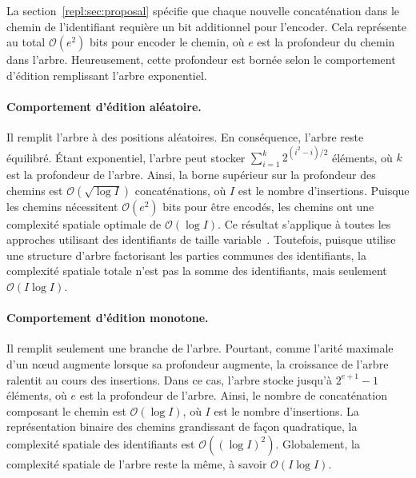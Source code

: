 La section~\ref{repl:sec:proposal} spécifie que chaque nouvelle concaténation
dans le chemin de l'identifiant requière un bit additionnel pour l'encoder. Cela
représente au total $\mathcal{O}(e^2)$ bits pour encoder le chemin, où $e$ est
la profondeur du chemin dans l'arbre. Heureusement, cette profondeur est bornée
selon le comportement d'édition remplissant l'arbre exponentiel. 


\begin{figure}
  \begin{center}
  \end{center}
\end{figure}


\paragraph{Comportement d'édition aléatoire. } Il remplit l'arbre à des positions
aléatoires. En conséquence, l'arbre reste équilibré. Étant exponentiel, l'arbre
peut stocker $\textstyle\sum\nolimits_{i=1}^{k}{2^{(i^2-i)/2}}$ éléments, où $k$
est la profondeur de l'arbre. Ainsi, la borne supérieur sur la profondeur des
chemins est $\mathcal{O}(\sqrt{\log I})$ concaténations, où $I$ est le nombre
d'insertions. Puisque les chemins nécessitent $\mathcal{O}(e^2)$ bits pour être
encodés, les chemins ont une complexité spatiale optimale de
$\mathcal{O}(\log I)$. Ce résultat s'applique à toutes les approches utilisant
des identifiants de taille variable~\cite{preguica2009commutative,
  weiss2009logoot}. Toutefois, puisque \LSEQ utilise une structure d'arbre
factorisant les parties communes des identifiants, la complexité spatiale totale
n'est pas la somme des identifiants, mais seulement $\mathcal{O}(I\log I)$.

\paragraph{Comportement d'édition monotone.} Il remplit seulement une branche de
l'arbre. Pourtant, comme l'arité maximale d'un nœud augmente lorsque sa
profondeur augmente, la croissance de l'arbre ralentit au cours des
insertions. Dans ce cas, l'arbre stocke jusqu'à $2^{e+1}-1$ éléments, où $e$ est
la profondeur de l'arbre. Ainsi, le nombre de concaténation composant le chemin
est $\mathcal{O}(\log I)$, où $I$ est le nombre d'insertions. La représentation
binaire des chemins grandissant de façon quadratique, la complexité spatiale des
identifiants est $\mathcal{O}((\log I)^2)$. Globalement, la complexité spatiale
de l'arbre reste la même, à savoir $\mathcal{O}(I \log I)$.

